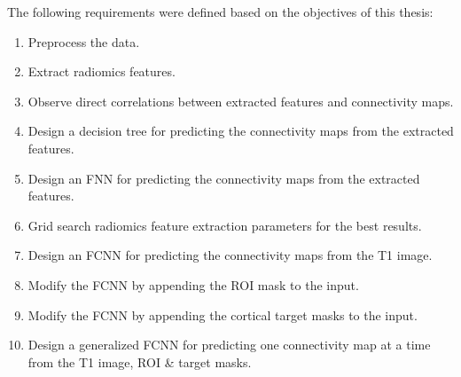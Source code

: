 The following requirements were defined based on the objectives of this thesis:

\begin{enumerate}
  \item Preprocess the data.
  \item Extract radiomics features.
  \item Observe direct correlations between extracted features and connectivity maps.
  \item Design a decision tree for predicting the connectivity maps from the extracted features.
  \item Design an \ac{FNN} for predicting the connectivity maps from the extracted features.
  \item Grid search radiomics feature extraction parameters for the best results.
  \item Design an \ac{FCNN} for predicting the connectivity maps from the T1 image.
  \item Modify the \ac{FCNN} by appending the \ac{ROI} mask to the input.
  \item Modify the \ac{FCNN} by appending the cortical target masks to the input.
  \item Design a generalized \ac{FCNN} for predicting one connectivity map at a time from the T1 image, \ac{ROI} \& target masks.
\end{enumerate}
